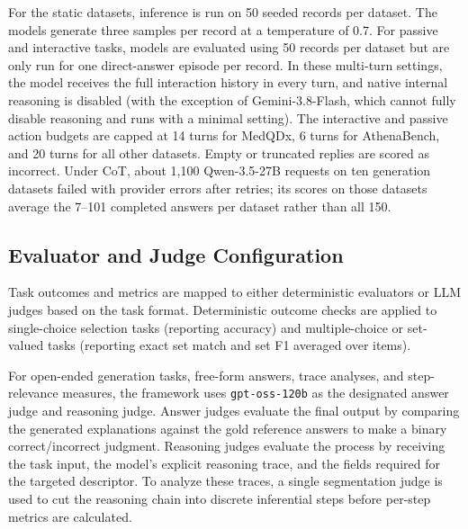 For the static datasets, inference is run on 50 seeded records per dataset. The models generate three samples per record at a temperature of 0.7. For passive and interactive tasks, models are evaluated using 50 records per dataset but are only run for one direct-answer episode per record. In these multi-turn settings, the model receives the full interaction history in every turn, and native internal reasoning is disabled (with the exception of Gemini-3.8-Flash, which cannot fully disable reasoning and runs with a minimal setting). The interactive and passive action budgets are capped at 14 turns for MedQDx, 6 turns for AthenaBench, and 20 turns for all other datasets. Empty or truncated replies are scored as incorrect. Under CoT, about 1,100 Qwen-3.5-27B requests on ten generation datasets failed with provider errors after retries; its scores on those datasets average the 7--101 completed answers per dataset rather than all 150.

\subsection{Evaluator and Judge Configuration}
\label{app:evaluator_configuration}

Task outcomes and metrics are mapped to either deterministic evaluators or LLM judges based on the task format. Deterministic outcome checks are applied to single-choice selection tasks (reporting accuracy) and multiple-choice or set-valued tasks (reporting exact set match and set F1 averaged over items). 

For open-ended generation tasks, free-form answers, trace analyses, and step-relevance measures, the framework uses \texttt{gpt-oss-120b} as the designated answer judge and reasoning judge. Answer judges evaluate the final output by comparing the generated explanations against the gold reference answers to make a binary correct/incorrect judgment. Reasoning judges evaluate the process by receiving the task input, the model's explicit reasoning trace, and the fields required for the targeted descriptor. To analyze these traces, a single segmentation judge is used to cut the reasoning chain into discrete inferential steps before per-step metrics are calculated.

